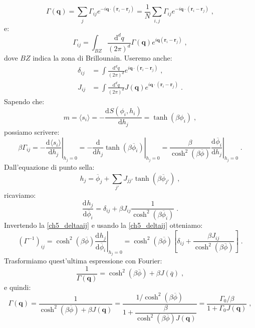 \documentclass[10pt,a4paper]{report}
\theoremstyle{definition}
\newcommand{\dev}[3][]{\frac{\mathrm{d}^{#1} #2}{\mathrm{d} #3^{#1}}}
\numberwithin{equation}{section}
\newcommand{\diff}[1][]{\mathrm{d}#1}
\newcommand{\bra}{\langle}
\newcommand{\ket}{\rangle}
\begin{document}
\begin{equation}
\Gamma(\mathbf{q})=\sum_j\Gamma_{ij}e^{-i\mathbf{q}\cdot(\mathbf{r}_i-\mathbf{r}_j)}=\frac{1}{N}\sum_{i,j}\Gamma_{ij}e^{-i\mathbf{q}\cdot(\mathbf{r}_i-\mathbf{r}_j)}\;,
\end{equation}
e:
\begin{equation}
\Gamma_{ij}=\int_{BZ}\frac{\diff^d{q}}{(2\pi)^d}\Gamma(\mathbf{q})e^{i\mathbf{q}(\mathbf{r}_i-\mathbf{r}_j)}\;,
\end{equation}
dove $BZ$ indica la zona di Brillounain. Useremo anche:
\begin{align}
\delta_{ij} &= \int\frac{\diff^d{q}}{(2\pi)^d}e^{i\mathbf{q}\cdot(\mathbf{r}_i-\mathbf{r}_j)}\;, \label{ch5_deltaaij} \\
J_{ij} &=\int\frac{\diff^d{q}}{(2\pi)^d}J(\mathbf{q})e^{i\mathbf{q}\cdot(\mathbf{r}_i-\mathbf{r}_j)}\;. \label{ch5_jij}
\end{align}
Sapendo che:
$$
m=\bra s_i\ket=-\dev{S(\phi_i,h_i)}{h_j}=\tanh(\beta\phi_i)\;,
$$
possiamo scrivere:
\begin{equation}
\beta\Gamma_{ij}=-\left.\dev{\bra s_i\ket}{h_j}\right|_{h_j=0}=-\left.\frac{\diff}{\diff{h_j}}\tanh(\beta\overline{\phi}_i)\right|_{h_j=0}=\frac{\beta}{\cosh^2(\beta\overline{\phi})}\left.\dev{\overline{\phi}_i}{h_j}\right|_{h_j=0}\;.
\end{equation}
Dall'equazione di punto sella:
$$
h_j=\overline{\phi}_j+\sum_{j'}J_{jj'}\tanh(\beta\overline{\phi}_{j'})\;,
$$
ricaviamo:
\begin{equation}
\dev{h_j}{\overline{\phi}_i}=\delta_{ij}+\beta J_{ij}\frac{1}{\cosh^2(\beta\overline{\phi}_i)}\;.
\end{equation}
Invertendo la \eqref{ch5_deltaaij} e usando la \eqref{ch5_deltaij} otteniamo:
\begin{equation}
(\Gamma^{-1})_{ij}=\cosh^2(\beta\overline{\phi})\left.\dev{h_j}{\overline{\phi}_i}\right|_{h_j=0}=\cosh^2(\beta\overline{\phi})\left[\delta_{ij}+\frac{\beta J_{ij}}{\cosh^2(\beta\overline{\phi})}\right]\;.
\end{equation}
Trasformiamo quest'ultima espressione con Fourier:
$$
\frac{1}{\Gamma(\mathbf{q})}=\cosh^2(\beta\overline{\phi})+\beta J(\overline{q})\;,
$$
e quindi:
\begin{equation}
\Gamma(\mathbf{q}) =\frac{1}{\cosh^2(\beta\overline{\phi})+\beta J(\mathbf{q})}=\frac{1/\cosh^2(\beta\overline{\phi})}{1+\dfrac{\beta}{\cosh^2(\beta\overline{\phi})J(\mathbf{q})}}=\frac{\Gamma_0/\beta}{1+\Gamma_0J(\mathbf{q})}\;,
\end{equation}
\end{document}
